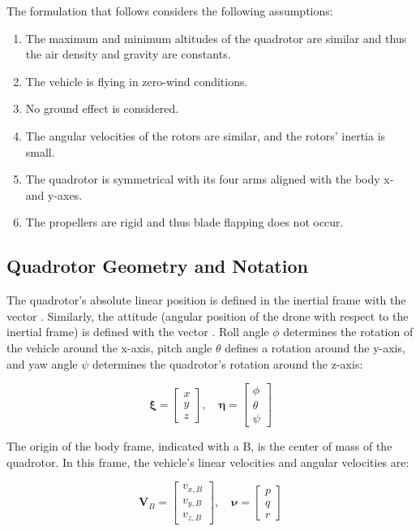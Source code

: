 \documentclass[letterpaper, 10 pt, conference]{ieeeconf}  %
\begin{document}
The formulation that follows considers the following assumptions:
\begin{enumerate}
	\item The maximum and minimum altitudes of the quadrotor are similar and thus the air density and gravity are constants.
	\item The vehicle is flying in zero-wind conditions.
	\item No ground effect is considered.
	\item \label{as:Ir} The angular velocities of the rotors are similar, and the rotors' inertia is small.
	\item \label{as:inertia} The quadrotor is symmetrical with its four arms aligned with the body x- and y-axes.
	\item The propellers are rigid and thus blade flapping does not occur.
\end{enumerate}

\subsection{Quadrotor Geometry and Notation}

The quadrotor's absolute linear position is defined in the inertial frame with the vector \bm{$\xi$}. Similarly, the attitude (angular position of the drone with respect to the inertial frame) is defined with the vector \bm{$\eta$}. Roll angle $\phi$ determines the rotation of the vehicle around the x-axis, pitch angle $\theta$ defines a rotation around the y-axis, and yaw angle $\psi$ determines the quadrotor's rotation around the z-axis:


$$\bm{\xi}=\left[ \begin{array}{l}{x} \\ {y} \\ {z}\end{array}\right],
\quad \bm{\eta}=\left[ \begin{array}{l}{\phi} \\ {\theta} \\ {\psi}\end{array}\right]$$

The origin of the body frame, indicated with a B, is the center of mass of the quadrotor. In this frame, the vehicle's linear velocities  and angular velocities \bm{$\nu$} are:

$$\bm{V}_{B}=\left[ \begin{array}{c}{v_{x, B}} \\ {v_{y, B}} \\ {v_{z, B}}\end{array}\right], \quad \bm{\nu}=\left[ \begin{array}{l}{p} \\ {q} \\ {r}\end{array}\right]$$
\end{document}
